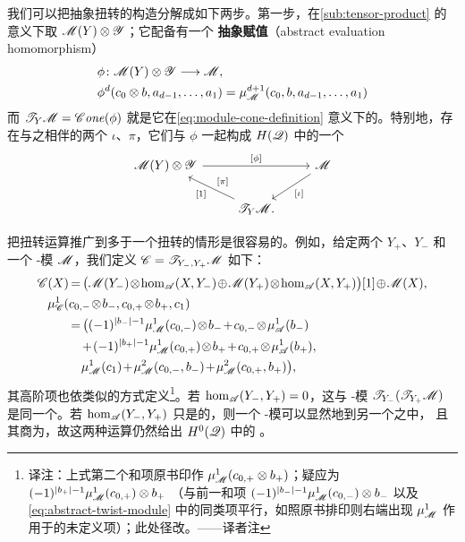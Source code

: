 我们可以把抽象扭转的构造分解成如下两步。第一步，在\cref{sub:tensor-product}
的意义下取\trTensorProduct{} $\mathscr{M}(Y)\otimes\mathscr{Y}$；它配备有一个%
\textbf{抽象赋值\trHomomorphism}（abstract evaluation homomorphism）
\begin{equation}\label{eq:abstract-evaluation-homomorphism}
\begin{aligned}
&\phi\colon\mathscr{M}(Y)\otimes\mathscr{Y}\longrightarrow\mathscr{M},\\
&\phi^d(c_0\otimes b,a_{d-1},\ldots,a_1)
=\mu^{d+1}_{\mathscr{M}}(c_0,b,a_{d-1},\ldots,a_1)
\end{aligned}
\end{equation}
而 $\mathscr{T}_Y\mathscr{M}=\mathscr{C}\mathit{one}(\phi)$ 就是它在\eqref{eq:module-cone-definition}
意义下的\trCone。特别地，存在与之相伴的两个\trModule{}\trHomomorphism{}%
$\iota$、$\pi$，它们与 $\phi$ 一起构成 $H(\mathscr{Q})$ 中的一个\trExactTriangle
\begin{equation}\label{eq:twist-exact-triangle}
\begin{tikzcd}
\scr{M}(Y)\otimes\scr{Y} \ar[rr,"{[\phi]}"] && \scr{M} \ar[dl,"{[\iota]}"] \\
& \scr{T}_Y\scr{M}. \ar[ul,"{[1]}"{pos=0.55},"{[\pi]}"{swap,pos=0.45}] &
\end{tikzcd}
\end{equation}

\begin{remark}\label{thm:multiple-twisting-objects}
把扭转运算推广到多于一个扭转\trObject{}的情形是很容易的。例如，给定两个\trObject{}%
$Y_+$、$Y_-$ 和一个 \trAinfty-模 $\mathscr{M}$，我们定义 $\mathscr{C}=\mathscr{T}_{Y_-,Y_+}\mathscr{M}$
如下：
\begin{equation*}
\medmuskip=1.5mu\relax\thickmuskip=3mu\relax
\begin{aligned}
\scr{C}(X)&=\bigl(\scr{M}(Y_-)\otimes\hom_{\scr{A}}(X,Y_-)
\oplus\scr{M}(Y_+)\otimes\hom_{\scr{A}}(X,Y_+)\bigr)[1]\oplus\scr{M}(X),\\
\mu^1_{\scr{C}}(&c_{0,-}\otimes b_-,c_{0,+}\otimes b_+,c_1)\\
&=\bigl((-1)^{|b_-|-1}\mu^1_{\scr{M}}(c_{0,-})\otimes b_-
+c_{0,-}\otimes\mu^1_{\scr{A}}(b_-)\\
&\quad+(-1)^{|b_+|-1}\mu^1_{\scr{M}}(c_{0,+})\otimes b_+
+c_{0,+}\otimes\mu^1_{\scr{A}}(b_+),\\
&\quad\mu^1_{\scr{M}}(c_1)+\mu^2_{\scr{M}}(c_{0,-},b_-)
+\mu^2_{\scr{M}}(c_{0,+},b_+)\bigr),
\end{aligned}
\end{equation*}
其高阶项也依类似的方式定义\footnote{译注：上式第二个和项原书印作
$\mu^1_{\mathscr{M}}(c_{0,+}\otimes b_+)$；疑应为 $(-1)^{|b_+|-1}\mu^1_{\mathscr{M}}(c_{0,+})\otimes b_+$
（与前一和项 $(-1)^{|b_-|-1}\mu^1_{\mathscr{M}}(c_{0,-})\otimes b_-$ 以及
\eqref{eq:abstract-twist-module} 中的同类项平行，如照原书排印则右端出现
$\mu^1_{\mathscr{M}}$ 作用于\trTensorProduct{}的未定义项）；此处径改。——译者注}。若
$\hom_{\mathscr{A}}(Y_-,Y_+)=0$，这与 \trAinfty-模
$\mathscr{T}_{Y_-}(\mathscr{T}_{Y_+}\mathscr{M})$ 是同一个。若 $\hom_{\mathscr{A}}(Y_-,Y_+)$
只是\trAcyclic{}的，则一个 \trAinfty-模可以显然地\trEmbedding{}到另一个之中，
且其商为\trAcyclic，故这两种运算仍然给出 $H^0(\mathscr{Q})$ 中\trIsomorphic{}的%
\trObject。
\end{remark}
